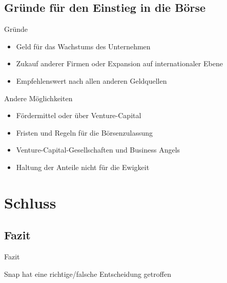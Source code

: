 \documentclass{beamer}
\begin{document}
\subsection{Gründe für den Einstieg in die Börse}
\begin{frame} {Gründe}
\begin{itemize}
\item Geld für das Wachstums des Unternehmen  \pause
\item Zukauf anderer Firmen oder Expansion auf internationaler Ebene   \pause
\item Empfehlenswert nach allen anderen Geldquellen   \pause
\end{itemize}
\end{frame}
\begin{frame} {Andere Möglichkeiten}
\begin{itemize}
\item Fördermittel oder über Venture-Capital 
\item Fristen und Regeln für die Börsenzulassung
\item Venture-Capital-Gesellschaften und Business Angels
\item Haltung der Anteile nicht für die Ewigkeit
\end{itemize}
\end{frame}

\section{Schluss}
\subsection{Fazit}
\begin{frame}{Fazit}

Snap hat eine richtige/falsche Entscheidung getroffen

\end{frame}
\end{document}
